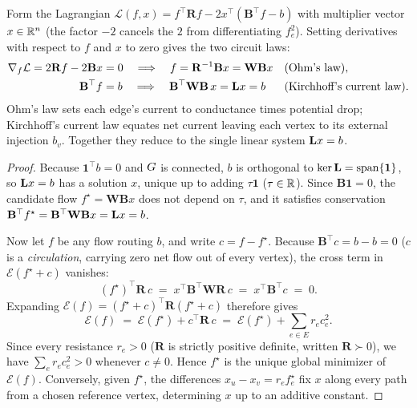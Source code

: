 \begin{whybox}
Form the Lagrangian $\mathcal{L}(f, x) = f^\top \mathbf{R} f - 2x^\top(\mathbf{B}^\top f - b)$ with multiplier vector $x\in\mathbb{R}^n$ (the factor $-2$ cancels the $2$ from differentiating $f_e^2$). Setting derivatives with respect to $f$ and $x$ to zero gives the two circuit laws:
\begin{align*}
  \nabla_f \mathcal{L} = 2\mathbf{R}f - 2\mathbf{B}x &= 0
    \quad\Longrightarrow\quad f = \mathbf{R}^{-1}\mathbf{B}x = \mathbf{W}\mathbf{B}x
    &&\text{(Ohm's law)}, \\
  \mathbf{B}^\top f &= b
    \quad\Longrightarrow\quad \mathbf{B}^\top\mathbf{W}\mathbf{B}\,x = \mathbf{L} x = b
    &&\text{(Kirchhoff's current law)}.
\end{align*}
Ohm's law sets each edge's current to conductance times potential drop; Kirchhoff's current law equates net current leaving each vertex to its external injection $b_v$. Together they reduce to the single linear system $\mathbf{L} x = b$.
\end{whybox}

\begin{proof}
Because $\mathbf{1}^\top b = 0$ and $G$ is connected, $b$ is orthogonal to $\ker\mathbf{L} = \operatorname{span}\{\mathbf{1}\}$, so $\mathbf{L} x = b$ has a solution $x$, unique up to adding $\tau\mathbf{1}$ ($\tau\in\mathbb{R}$). Since $\mathbf{B}\mathbf{1} = 0$, the candidate flow $f^\star = \mathbf{W}\mathbf{B}x$ does not depend on $\tau$, and it satisfies conservation $\mathbf{B}^\top f^\star = \mathbf{B}^\top\mathbf{W}\mathbf{B}x = \mathbf{L} x = b$.

Now let $f$ be any flow routing $b$, and write $c = f - f^\star$. Because $\mathbf{B}^\top c = b - b = 0$ ($c$ is a \emph{circulation}, carrying zero net flow out of every vertex), the cross term in $\mathcal{E}(f^\star + c)$ vanishes:
\[
  (f^\star)^\top \mathbf{R}\, c \;=\; x^\top \mathbf{B}^\top \mathbf{W}\mathbf{R}\, c \;=\; x^\top \mathbf{B}^\top c \;=\; 0 .
\]
Expanding $\mathcal{E}(f) = (f^\star + c)^\top \mathbf{R} (f^\star + c)$ therefore gives
\[
  \mathcal{E}(f) \;=\; \mathcal{E}(f^\star) + c^\top \mathbf{R}\, c \;=\; \mathcal{E}(f^\star) + \sum_{e \in E} r_e c_e^2 .
\]
Since every resistance $r_e > 0$ ($\mathbf{R}$ is strictly positive definite, written $\mathbf{R} \succ 0$), we have $\sum_e r_e c_e^2 > 0$ whenever $c \ne 0$. Hence $f^\star$ is the unique global minimizer of $\mathcal{E}(f)$. Conversely, given $f^\star$, the differences $x_u - x_v = r_e f^\star_e$ fix $x$ along every path from a chosen reference vertex, determining $x$ up to an additive constant.
\end{proof}

